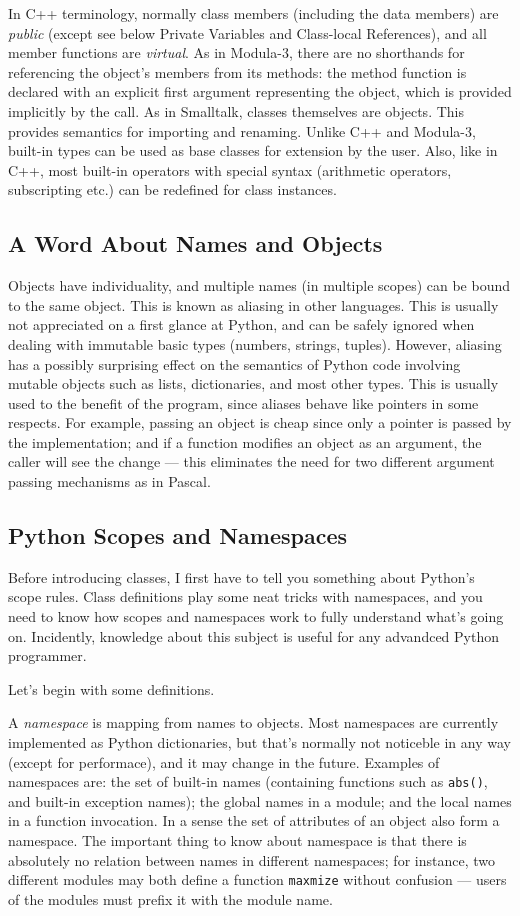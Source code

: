 \documentclass[UTF8]{article}
\begin{document}
In C++ terminology, normally class members (including the data members) are \emph{public} (except
see below Private Variables and Class-local References), and all member functions are
\emph{virtual}. As in Modula-3, there are no shorthands for referencing the object's members from
its methods: the method function is declared with an explicit first argument representing the
object, which is provided implicitly by the call. As in Smalltalk, classes themselves are objects.
This provides semantics for importing and renaming. Unlike C++ and Modula-3, built-in types can be
used as base classes for extension by the user. Also, like in C++, most built-in operators with
special syntax (arithmetic operators, subscripting etc.) can be redefined for class instances.

\subsection{A Word About Names and Objects}
Objects have individuality, and multiple names (in multiple scopes) can be bound to the same object.
This is known as aliasing in other languages. This is usually not appreciated on a first glance at
Python, and can be safely ignored when dealing with immutable basic types (numbers, strings,
tuples). However, aliasing has a possibly surprising effect on the semantics of Python code
involving mutable objects such as lists, dictionaries, and most other types. This is usually used
to the benefit of the program, since aliases behave like pointers in some respects. For example,
passing an object is cheap since only a pointer is passed by the implementation; and if a function
modifies an object as an argument, the caller will see the change --- this eliminates the need for
two different argument passing mechanisms as in Pascal.

\subsection{Python Scopes and Namespaces}
Before introducing classes, I first have to tell you something about Python's scope rules. Class
definitions play some neat tricks with namespaces, and you need to know how scopes and namespaces
work to fully understand what's going on. Incidently, knowledge about this subject is useful for
any advandced Python programmer.

Let's begin with some definitions.

A \emph{namespace} is mapping from names to objects. Most namespaces are currently implemented as
Python dictionaries, but that's normally not noticeble in any way (except for performace), and it
may change in the future. Examples of namespaces are: the set of built-in names (containing
functions such as \texttt{abs()}, and built-in exception names); the global names in a module; and
the local names in a function invocation. In a sense the set of attributes of an object also form a
namespace. The important thing to know about namespace is that there is absolutely no relation
between names in different namespaces; for instance, two different modules may both define a
function \texttt{maxmize} without confusion --- users of the modules must prefix it with the module
name.
\end{document}
